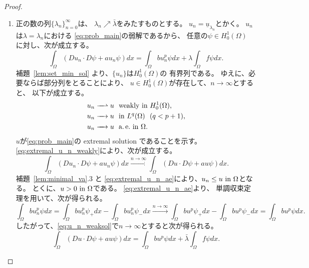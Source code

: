 \begin{proof}
 \begin{enumerate}[1.] \sage
  \item 正の数の列$\{ \lambda_n \}_{n=0}^\infty$は、
        $\lambda_n \nearrow \bar{\lambda}$をみたすものとする。
        $u_n = \underline{u}_{\lambda_n}$とかく。
        $u_n$は$\lambda = \lambda_n$における
         \ref{eq:prob_main}の弱解であるから、
        任意の$\psi \in H_0^1(\Omega)$
        に対し、次が成立する。
        \begin{equation}
         \int_\Omega (Du_n \cdot D\psi + a u_{n} \psi) dx 
          = \int_\Omega bu_n^p \psi dx + \lambda \int_\Omega f\psi dx.
          \label{eq:u_n_weaksol}
        \end{equation}
        補題~\ref{lem:set_min_sol} より、$\{ u_n \}$は$H_0^1(\Omega)$の
         有界列である。
        ゆえに、必要ならば部分列をとることにより、
        $u \in H_0^1(\Omega)$が存在して、$n \to \infty$とすると、
        以下が成立する。
        \begin{align}
         u_n \xrightharpoonup{ \mbox{ ~ } } u & \ \ \text{weakly~} \tin
         H_0^1(\Omega), \label{eq:extremal_u_n_weakly} \\
         u_n \xrightarrow{ \mbox{ ~ } } u & \ \ \tin L^q(\Omega) \ \
          (q < p+1), \notag \\
         u_n \xrightarrow{ \mbox{ ~ } } u & \ \ \ae \tin \Omega. 
         \label{eq:extremal_u_n_ae}
        \end{align}
        $u$が\ref{eq:prob_main}の extremal solution であることを示す。
        \eqref{eq:extremal_u_n_weakly}により、次が成立する。
        \[
        \int_\Omega (Du_n \cdot D\psi + a u_n \psi) dx
        \xrightarrow{n \to \infty}
        \int_\Omega (Du \cdot D\psi + a u \psi) dx.
        \]
         補題~\ref{lem:minimal_va}.3 と
        \eqref{eq:extremal_u_n_ae}により、$u_n \leq u ~\text{in}~ \Omega$となる。
        とくに、$u > 0 ~\text{in}~ \Omega$である。
        \eqref{eq:extremal_u_n_ae}より、
        単調収束定理を用いて、次が得られる。
        \[
        \int_\Omega bu_n^p \psi dx 
        = \int_\Omega bu_n^p \psi_+ dx - 
        \int_\Omega bu_n^p \psi_- dx
        \xrightarrow{n \to \infty}
        \int_\Omega bu^p \psi_+ dx -
        \int_\Omega bu^p \psi_- dx =
        \int_\Omega bu^p \psi dx.
        \]
        したがって、\eqref{eq:u_n_weaksol}で$n \to \infty$とすると次が得られる。
        \[ 
         \int_\Omega (Du \cdot D\psi + a u \psi) dx 
          = \int_\Omega bu^p \psi dx + \bar{\lambda} \int_\Omega f\psi dx.
        \]

\end{enumerate}
\end{proof}
